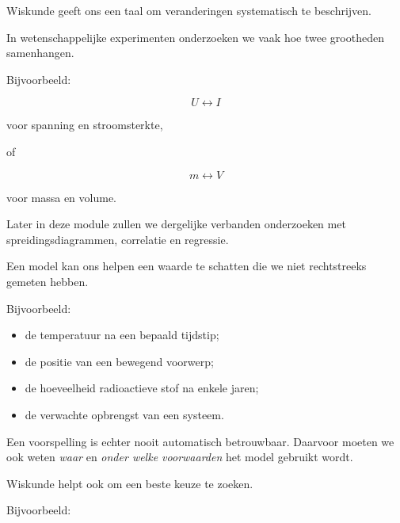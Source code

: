 \documentclass{ximera}
\begin{document}
Wiskunde geeft ons een taal om veranderingen systematisch te
beschrijven.




In wetenschappelijke experimenten onderzoeken we vaak hoe twee
grootheden samenhangen.

Bijvoorbeeld:

\[
U \longleftrightarrow I
\]

voor spanning en stroomsterkte,

of

\[
m \longleftrightarrow V
\]

voor massa en volume.

Later in deze module zullen we dergelijke verbanden onderzoeken met
spreidingsdiagrammen, correlatie en regressie.




Een model kan ons helpen een waarde te schatten die we niet rechtstreeks
gemeten hebben.

Bijvoorbeeld:

\begin{itemize}
  \item de temperatuur na een bepaald tijdstip;
  \item de positie van een bewegend voorwerp;
  \item de hoeveelheid radioactieve stof na enkele jaren;
  \item de verwachte opbrengst van een systeem.
\end{itemize}

Een voorspelling is echter nooit automatisch betrouwbaar. Daarvoor moeten we ook weten \emph{waar} en \emph{onder welke
voorwaarden} het model gebruikt wordt.




Wiskunde helpt ook om een beste keuze te zoeken.

Bijvoorbeeld:
\end{document}
